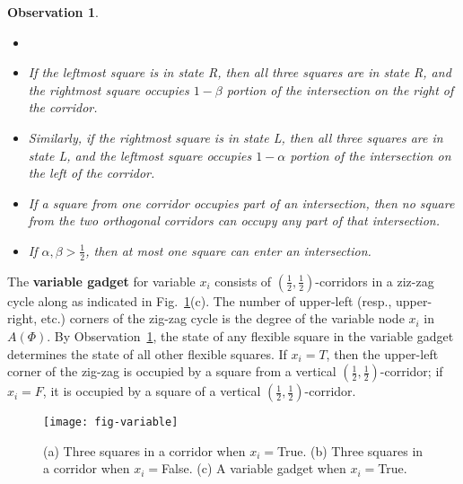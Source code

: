 \documentclass{llncs}
\newtheorem{observation}{Observation}
\begin{document}
\begin{observation}\label{obs:ab}
\begin{itemize}%
\item[]
\item If the leftmost square is in state R, then all three squares are in state R, and the rightmost square occupies $1-\beta$ portion of the intersection on the right of the corridor.
\item Similarly, if the rightmost square is in state L, then all three squares are in state L, and the leftmost square occupies $1-\alpha$ portion of the intersection on the left  of the corridor.
\item If a square from one corridor occupies part of an intersection, then no square from the two  orthogonal corridors can occupy any part of that intersection.
\item If $\alpha,\beta>\frac{1}{2}$, then at most one square can enter an intersection.
\end{itemize}
\end{observation}


The {\bf variable gadget} for variable $x_i$ consists of $(\frac{1}{2},\frac{1}{2})$-corridors in a ziz-zag cycle along as indicated in Fig.~\ref{fig:variable}(c). The number of upper-left (resp., upper-right, etc.) corners of the zig-zag cycle is the degree of the variable node $x_i$ in $A(\Phi)$.
By Observation~\ref{obs:ab}, the state of any flexible square in the variable gadget determines the state of all other flexible squares. If $x_i=T$, then the upper-left corner of the zig-zag is occupied by a square from a vertical $(\frac{1}{2},\frac{1}{2})$-corridor; if $x_i=F$, it is occupied by a square of a vertical $(\frac{1}{2},\frac{1}{2})$-corridor.

\begin{figure}[htbp]
	\centering
	\texttt{[image: fig-variable]}
	\caption{(a) Three squares in a corridor when $x_i=${\sc True}.
(b)  Three squares in a corridor when $x_i=${\sc False}.
(c) A variable gadget when $x_i=${\sc True}. }
	\label{fig:variable}
\end{figure}
\end{document}
